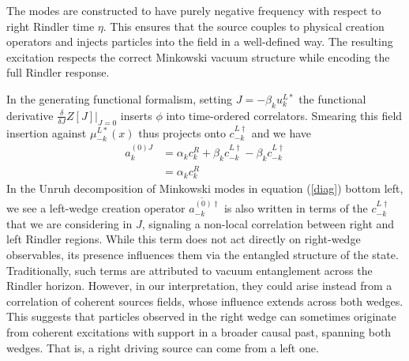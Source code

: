 \documentclass[12pt,a4paper]{article}
\begin{document}
The modes are constructed to have purely negative frequency with respect to right Rindler time $\eta$. This ensures that the source couples to physical creation operators and injects particles into the field in a well-defined way. The resulting excitation respects the correct Minkowski vacuum structure while encoding the full Rindler response.

In the generating functional formalism, setting $J = -\beta_k u_k^{L*}$ the functional derivative $\frac{\delta}{\delta J}Z[J]|_{J=0}$ inserts $\phi$ into time-ordered correlators. Smearing this field insertion against $\mu_{-k}^{L*}(x)$ thus projects onto $c_{-k}^{L\dagger}$ and we have
\begin{equation}
\begin{array}{ll}
  a_k^{(0)J} &= \alpha_k c_k^R + \beta_k c_{-k}^{L\dagger} -  \beta_k c_{-k}^{L\dagger} \\
  &= \alpha_k c_k^R
\end{array}
\end{equation}
In the Unruh decomposition of Minkowski modes in equation (\ref{diag}) bottom left, we see a left-wedge creation operator $a^{\widetilde{(0)}\dagger}_{-k}$ is also written in terms of the $c_{-k}^{L\dagger}$ that we are considering in $J$, signaling a non-local correlation between right and left Rindler regions. While this term does not act directly on right-wedge observables, its presence influences them via the entangled structure of the state. Traditionally, such terms are attributed to vacuum entanglement across the Rindler horizon. However, in our interpretation, they could arise instead from a correlation of coherent sources fields, whose influence extends across both wedges. This suggests that particles observed in the right wedge can sometimes originate from coherent excitations with support in a broader causal past, spanning both wedges.  That is, a right driving source can come from a left one.
\end{document}
